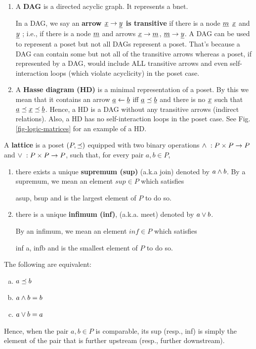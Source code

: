 \begin{enumerate}

\item A {\bf DAG} is a directed acyclic graph. It represents a bnet.

In a DAG, we say an {\bf arrow
$\rvx\rarrow \rvy$ is transitive}  if there is a node $\rvm$  $\rvx$ and $\rvy$ ; i.e.,  if there is
a node $\rvm$ and arrows $\rvx\rarrow \rvm$, $\rvm\rarrow \rvy$.
A DAG can be used to represent a
poset but not all DAGs represent a poset. That's because a DAG can contain some
but not all of the transitive arrows whereas a poset, if   represented by a DAG,
would include ALL transitive arrows
and even self-interaction loops
(which
violate acyclicity)
in the poset case.

\item A {\bf Hasse diagram (HD)} is a minimal representation of a poset.
By this we mean that
it contains an arrow $\rva\larrow \rvb$ iff $\rva \pord \rvb$ and there is no
$\rvx$ such that $\rva\pord \rvx\pord \rvb$.
Hence, a HD is a DAG
without any transitive arrows (indirect relations).
Also, a HD has no self-interaction loops
in the poset case.
See Fig.\ref{fig-logic-matrices} for an example
of a HD.
\end{enumerate}

A {\bf lattice} is a poset $(P, \preceq)$ equipped with two binary operations $\wedge\;: P\times P\rightarrow P$ and $\vee\;: P\times P\rightarrow P$, such that, for every pair $a, b\in P$,

\begin{enumerate}
\item there exists a unique {\bf supremum (sup)} (a.k.a join)
denoted by $a\wedge b$.
By a supremum, we mean an element $sup\in P$
which satisfies

\beq
a\pord sup, \quad b\pord sup
\eeq
and is the largest element
of $P$ to do so.


\item there is  a unique
{\bf infimum (inf)}, (a.k.a. {meet}) denoted by $a\vee b$.

By an infimum, we mean an element $inf\in P$
which satisfies

\beq
inf \pord a, \quad inf\pord b
\eeq
and is the smallest element
of $P$ to do so.
\end{enumerate}





\begin{claim} \label{cl-relation-pord-and-or}
The following are
equivalent:

\begin{enumerate}[(a)]

\item
$a\preceq b$

\item
$a\wedge b =b$


\item
$a \vee b =a$
\end{enumerate}
Hence, when the pair $a,b\in P$ is comparable,  its sup (resp., inf) is simply the element of the pair that is further upstream (resp., further downstream).
\end{claim}
\proof

